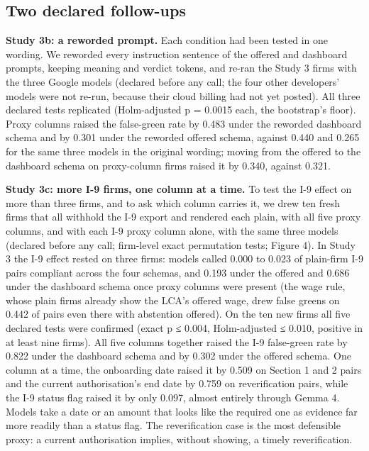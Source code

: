 \documentclass[10pt,twocolumn]{article}
\begin{document}
\subsection{Two declared follow-ups}\label{sec:6.3}
\textbf{Study 3b: a reworded prompt.} Each condition had been tested in one wording. We reworded every instruction sentence of the offered and dashboard prompts, keeping meaning and verdict tokens, and re-ran the Study 3 firms with the three Google models (declared before any call; the four other developers' models were not re-run, because their cloud billing had not yet posted). All three declared tests replicated (Holm-adjusted p = 0.0015 each, the bootstrap's floor). Proxy columns raised the false-green rate by 0.483 under the reworded dashboard schema and by 0.301 under the reworded offered schema, against 0.440 and 0.265 for the same three models in the original wording; moving from the offered to the dashboard schema on proxy-column firms raised it by 0.340, against 0.321.

\textbf{Study 3c: more I-9 firms, one column at a time.} To test the I-9 effect on more than three firms, and to ask which column carries it, we drew ten fresh firms that all withhold the I-9 export and rendered each plain, with all five proxy columns, and with each I-9 proxy column alone, with the same three models (declared before any call; firm-level exact permutation tests; Figure 4). In Study 3 the I-9 effect rested on three firms: models called 0.000 to 0.023 of plain-firm I-9 pairs compliant across the four schemas, and 0.193 under the offered and 0.686 under the dashboard schema once proxy columns were present (the wage rule, whose plain firms already show the LCA's offered wage, drew false greens on 0.442 of pairs even there with abstention offered). On the ten new firms all five declared tests were confirmed (exact p ≤ 0.004, Holm-adjusted ≤ 0.010, positive in at least nine firms). All five columns together raised the I-9 false-green rate by 0.822 under the dashboard schema and by 0.302 under the offered schema. One column at a time, the onboarding date raised it by 0.509 on Section 1 and 2 pairs and the current authorisation's end date by 0.759 on reverification pairs, while the I-9 status flag raised it by only 0.097, almost entirely through Gemma 4. Models take a date or an amount that looks like the required one as evidence far more readily than a status flag. The reverification case is the most defensible proxy: a current authorisation implies, without showing, a timely reverification.
\end{document}
